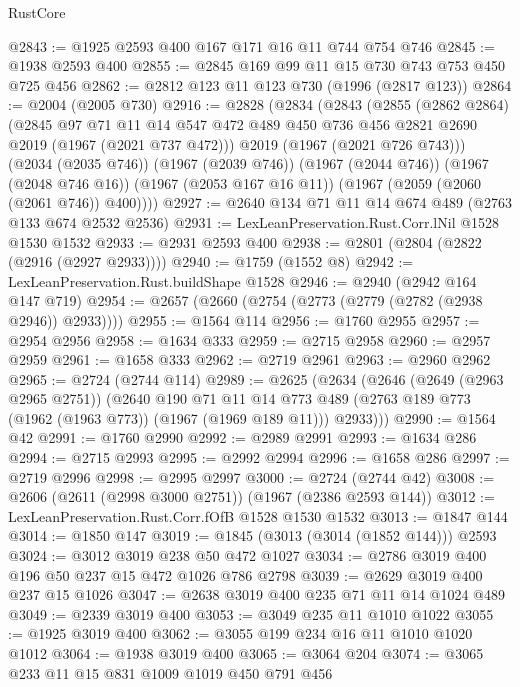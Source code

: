\begin{lexlean}{RustCore}
\begin{coremodule}
@2843 := @1925 @2593 @400 @167 @171 @16 @11 @744 @754 @746
@2845 := @1938 @2593 @400
@2855 := @2845 @169 @99 @11 @15 @730 @743 @753 @450 @725 @456
@2862 := @2812 @123 @11 @123 @730 (@1996 (@2817 @123))
@2864 := @2004 (@2005 @730)
@2916 := @2828
    (@2834
      (@2843
        (@2855
          (@2862 @2864)
          (@2845
            @97
            @71
            @11
            @14
            @547
            @472
            @489
            @450
            @736
            @456
            @2821
            @2690
            @2019
            (@1967 (@2021 @737 @472)))
          @2019
          (@1967 (@2021 @726 @743)))
        (@2034 (@2035 @746))
        (@1967 (@2039 @746))
        (@1967 (@2044 @746))
        (@1967 (@2048 @746 @16))
        (@1967 (@2053 @167 @16 @11))
        (@1967 (@2059 (@2060 (@2061 @746)) @400))))
@2927 := @2640 @134 @71 @11 @14 @674 @489 (@2763 @133 @674 @2532 @2536)
@2931 := LexLeanPreservation.Rust.Corr.lNil @1528 @1530 @1532
@2933 := @2931 @2593 @400
@2938 := @2801 (@2804 (@2822 (@2916 (@2927 @2933))))
@2940 := @1759 (@1552 @8)
@2942 := LexLeanPreservation.Rust.buildShape @1528
@2946 := @2940 (@2942 @164 @147 @719)
@2954 := @2657 (@2660 (@2754 (@2773 (@2779 (@2782 (@2938 @2946)) @2933))))
@2955 := @1564 @114
@2956 := @1760 @2955
@2957 := @2954 @2956
@2958 := @1634 @333
@2959 := @2715 @2958
@2960 := @2957 @2959
@2961 := @1658 @333
@2962 := @2719 @2961
@2963 := @2960 @2962
@2965 := @2724 (@2744 @114)
@2989 := @2625
    (@2634
      (@2646
        (@2649 (@2963 @2965 @2751))
        (@2640
          @190
          @71
          @11
          @14
          @773
          @489
          (@2763 @189 @773 (@1962 (@1963 @773)) (@1967 (@1969 @189 @11)))
          @2933)))
@2990 := @1564 @42
@2991 := @1760 @2990
@2992 := @2989 @2991
@2993 := @1634 @286
@2994 := @2715 @2993
@2995 := @2992 @2994
@2996 := @1658 @286
@2997 := @2719 @2996
@2998 := @2995 @2997
@3000 := @2724 (@2744 @42)
@3008 := @2606 (@2611 (@2998 @3000 @2751)) (@1967 (@2386 @2593 @144))
@3012 := LexLeanPreservation.Rust.Corr.fOfB @1528 @1530 @1532
@3013 := @1847 @144
@3014 := @1850 @147
@3019 := @1845 (@3013 (@3014 (@1852 @144))) @2593
@3024 := @3012 @3019 @238 @50 @472 @1027
@3034 := @2786 @3019 @400 @196 @50 @237 @15 @472 @1026 @786 @2798
@3039 := @2629 @3019 @400 @237 @15 @1026
@3047 := @2638 @3019 @400 @235 @71 @11 @14 @1024 @489
@3049 := @2339 @3019 @400
@3053 := @3049 @235 @11 @1010 @1022
@3055 := @1925 @3019 @400
@3062 := @3055 @199 @234 @16 @11 @1010 @1020 @1012
@3064 := @1938 @3019 @400
@3065 := @3064 @204
@3074 := @3065 @233 @11 @15 @831 @1009 @1019 @450 @791 @456

\end{coremodule}
\end{lexlean}
